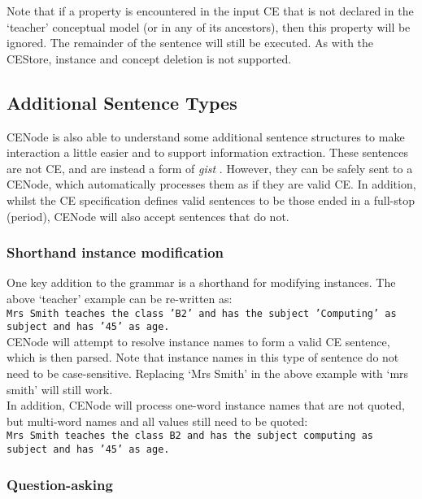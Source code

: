 \documentclass{scrartcl}
\begin{document}
Note that if a property is encountered in the input CE that is not declared in the `teacher' conceptual model (or in any of its ancestors), then this property will be ignored. The remainder of the sentence will still be executed. As with the CEStore, instance and concept deletion is not supported.\\

\subsection{Additional Sentence Types}
CENode is also able to understand some additional sentence structures to make interaction a little easier and to support information extraction. These sentences are not CE, and are instead a form of \textit{gist} \cite{preece14hmc}. However, they can be safely sent to a CENode, which automatically processes them as if they are valid CE. In addition, whilst the CE specification defines valid sentences to be those ended in a full-stop (period), CENode will also accept sentences that do not.\\


\subsubsection{Shorthand instance modification}

One key addition to the grammar is a shorthand for modifying instances. The above `teacher' example can be re-written as:\\
\texttt{Mrs Smith teaches the class 'B2' and has the subject 'Computing' as subject and has '45' as age.}\\

CENode will attempt to resolve instance names to form a valid CE sentence, which is then parsed. Note that instance names in this type of sentence do not need to be case-sensitive. Replacing `Mrs Smith' in the above example with `mrs smith' will still work.\\

In addition, CENode will process one-word instance names that are not quoted, but multi-word names and all values still need to be quoted:\\
\texttt{Mrs Smith teaches the class B2 and has the subject computing as subject and has '45' as age.}

\subsubsection{Question-asking}
\end{document}
